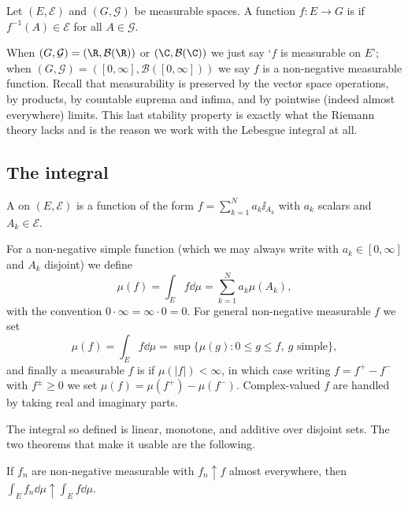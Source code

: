 \begin{definition}
	Let $(E, \mathcal{E})$ and $(G, \mathcal{G})$ be measurable spaces. A function $f : E \to G$ is  if $f^{-1}(A) \in \mathcal{E}$ for all $A \in \mathcal{G}$.
\end{definition}

When $(G, \mathcal{G}) = (\R, \mathcal{B}(\R))$ or $(\C, \mathcal{B}(\C))$ we just say `$f$ is measurable on $E$'; when $(G,\mathcal{G}) = ([0,\infty], \mathcal{B}([0,\infty]))$ we say $f$ is a non-negative measurable function. Recall that measurability is preserved by the vector space operations, by products, by countable suprema and infima, and by pointwise (indeed almost everywhere) limits. This last stability property is exactly what the Riemann theory lacks and is the reason we work with the Lebesgue integral at all.

\subsection{The integral}

\begin{definition}
	A  on $(E, \mathcal{E})$ is a function of the form $f = \sum_{k=1}^N a_k \ii_{A_k}$ with $a_k$ scalars and $A_k \in \mathcal{E}$.
\end{definition}

For a non-negative simple function (which we may always write with $a_k \in [0,\infty]$ and $A_k$ disjoint) we define
$$\mu(f) = \int_E f \dd\mu = \sum_{k=1}^N a_k \mu(A_k),$$
with the convention $0 \cdot \infty = \infty \cdot 0 = 0$. For general non-negative measurable $f$ we set
$$\mu(f) = \int_E f \dd \mu = \sup\{ \mu(g) : 0 \le g \le f, \ g \text{ simple}\},$$
and finally a measurable $f$ is  if $\mu(|f|) < \infty$, in which case writing $f = f^+ - f^-$ with $f^\pm \ge 0$ we set $\mu(f) = \mu(f^+) - \mu(f^-)$. Complex-valued $f$ are handled by taking real and imaginary parts.

The integral so defined is linear, monotone, and additive over disjoint sets. The two theorems that make it usable are the following.

\begin{theorem}\label{aof-thm:mct}
	If $f_n$ are non-negative measurable with $f_n \uparrow f$ almost everywhere, then $\int_E f_n \dd\mu \uparrow \int_E f \dd \mu$.
\end{theorem}


